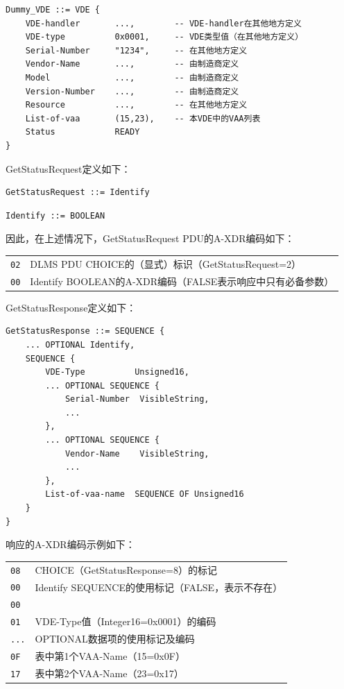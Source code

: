 \documentclass[a4paper,11pt]{ctexart}
\begin{document}
\begin{verbatim}
Dummy_VDE ::= VDE {
    VDE-handler       ...,        -- VDE-handler在其他地方定义
    VDE-type          0x0001,     -- VDE类型值（在其他地方定义）
    Serial-Number     "1234",     -- 在其他地方定义
    Vendor-Name       ...,        -- 由制造商定义
    Model             ...,        -- 由制造商定义
    Version-Number    ...,        -- 由制造商定义
    Resource          ...,        -- 在其他地方定义
    List-of-vaa       (15,23),    -- 本VDE中的VAA列表
    Status            READY
}
\end{verbatim}

\noindent GetStatusRequest定义如下：
\begin{verbatim}
GetStatusRequest ::= Identify
\end{verbatim}
\begin{verbatim}
Identify ::= BOOLEAN
\end{verbatim}

\noindent 因此，在上述情况下，GetStatusRequest PDU的A-XDR编码如下：

\begin{center}
\begin{tabular}{ll}
\texttt{02} & DLMS PDU CHOICE的（显式）标识（GetStatusRequest=2）\\
\texttt{00} & Identify BOOLEAN的A-XDR编码（FALSE表示响应中只有必备参数）\\
\end{tabular}
\end{center}

\noindent GetStatusResponse定义如下：
\begin{verbatim}
GetStatusResponse ::= SEQUENCE {
    ... OPTIONAL Identify,
    SEQUENCE {
        VDE-Type          Unsigned16,
        ... OPTIONAL SEQUENCE {
            Serial-Number  VisibleString,
            ...
        },
        ... OPTIONAL SEQUENCE {
            Vendor-Name    VisibleString,
            ...
        },
        List-of-vaa-name  SEQUENCE OF Unsigned16
    }
}
\end{verbatim}

\noindent 响应的A-XDR编码示例如下：

\begin{center}
\begin{tabular}{ll}
\texttt{08} & CHOICE（GetStatusResponse=8）的标记 \\
\texttt{00} & Identify SEQUENCE的使用标记（FALSE，表示不存在）\\
\texttt{00} & \\
\texttt{01} & VDE-Type值（Integer16=0x0001）的编码 \\
\texttt{...} & OPTIONAL数据项的使用标记及编码 \\
\texttt{0F} & 表中第1个VAA-Name（15=0x0F）\\
\texttt{17} & 表中第2个VAA-Name（23=0x17）\\
\end{tabular}
\end{center}
\end{document}
